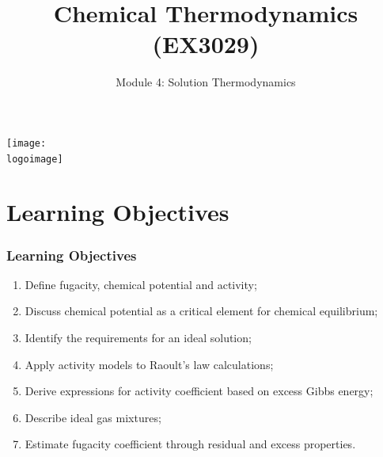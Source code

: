 \documentclass[10pt,compress,unknownkeysallowed]{beamer}
\institute{School of Engineering}
\title{Chemical Thermodynamics (EX3029)}
\subtitle{Module 4: Solution Thermodynamics}
\date[ ]{ }
\newcommand{\logoimage}{../../FigBanner/UoAHorizBanner}
\begin{document}
\begin{frame}
  \titlepage
  \vfill%
  \begin{center}
    \texttt{[image: \\logoimage]}
  \end{center}
\end{frame}





\section{Learning Objectives}

\begin{frame}
 \frametitle{Learning Objectives}
   \begin{enumerate}
     \item<1-> Define fugacity, chemical potential and activity; 
     \item<1-> Discuss chemical potential as a critical element for chemical equilibrium;
     \item<1-> Identify the requirements for an ideal solution;       
     \item<1-> Apply activity models to Raoult's law calculations;
     \item<1-> Derive expressions for activity coefficient based on excess Gibbs energy;
     \item<1-> Describe ideal gas mixtures;
     \item<1-> Estimate fugacity coefficient through residual and excess properties.
   \end{enumerate}

\end{frame}

\end{document}
